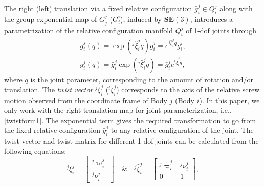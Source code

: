 \documentclass[lettersize,journal]{IEEEtran}
\def \SE {\textbf{SE}(3)}
\def \R  {\mathbb{R}}
\theoremstyle{remark}
\begin{document}
The right (left) translation via a fixed relative configuration $\bar{g}^j_i\in Q_i^j$ along with the group exponential map of $G^j_j$ ($G_i^i$), induced by $\SE$, introduces a parametrization of the relative configuration manifold $Q_i^j$ of 1-dof joints through  
\begin{align}
       g^j_i(q)=\exp(^j\hat{\xi}^j_iq)\bar{g}^j_i=e^{^j\hat{\xi}^j_iq}\bar{g}^j_i,\label{twistform1}\\ g^j_i(q)=\bar{g}^j_i{}\exp(^i\hat{\xi}^j_iq)=\bar{g}^j_i{} e^{^i\hat{\xi}^j_iq} ,
\end{align}
where $q$ is the joint parameter, corresponding to the amount of rotation and/or translation. The \textit{twist vector} $^j\xi_i^j$ ($^i\xi_i^j$) corresponds to the axis of the relative screw motion observed from the coordinate frame of Body $j$ (Body $i$). In this paper, we only work with the right translation map for joint parameterization, i.e., \eqref{twistform1}. The exponential term gives the required transformation to go from the fixed relative configuration $\bar{g}^j_i$ to any relative configuration of the joint. %
The twist vector and twist matrix for different 1-dof joints can be calculated from the following equations: 
\begin{equation}
    ^j\xi^j_i=\begin{bmatrix}^j\varpi_i^j \\^j\nu^j_i\end{bmatrix} \quad \& \quad ^j\hat{\xi}^j_i=\begin{bmatrix}^j\tilde{\varpi}_i^j  & ^j\nu^j_i \\0 & 1\end{bmatrix}, \label{twist1}
\end{equation}
\end{document}
